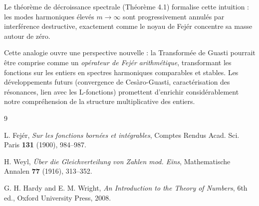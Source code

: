\documentclass[12pt,a4paper]{article}
\theoremstyle{definition}
\theoremstyle{remark}
\begin{document}
Le théorème de décroissance spectrale (Théorème 4.1) formalise cette intuition : les modes harmoniques élevés $m \to \infty$ sont progressivement annulés par interférence destructive, exactement comme le noyau de Fejér concentre sa masse autour de zéro.

Cette analogie ouvre une perspective nouvelle : la Transformée de Guasti pourrait être comprise comme un \emph{opérateur de Fejér arithmétique}, transformant les fonctions sur les entiers en spectres harmoniques comparables et stables. Les développements futurs (convergence de Cesàro-Guasti, caractérisation des résonances, lien avec les L-fonctions) promettent d'enrichir considérablement notre compréhension de la structure multiplicative des entiers.

\begin{thebibliography}{9}

L. Fejér, \textit{Sur les fonctions bornées et intégrables}, Comptes Rendus Acad. Sci. Paris \textbf{131} (1900), 984--987.

H. Weyl, \textit{Über die Gleichverteilung von Zahlen mod. Eins}, Mathematische Annalen \textbf{77} (1916), 313--352.

G. H. Hardy and E. M. Wright, \textit{An Introduction to the Theory of Numbers}, 6th ed., Oxford University Press, 2008.

\end{thebibliography}
\end{document}
